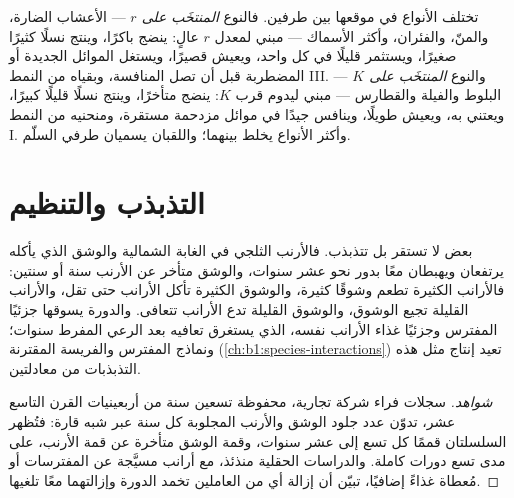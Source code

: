 \begin{definition}\label{def:b1:populations:rK}
تختلف الأنواع في موقعها بين طرفين. فالنوع \emph{المنتخَب على $r$}
--- الأعشاب الضارة، والمنّ، والفئران، وأكثر الأسماك --- مبني
لمعدل $r$ عالٍ: ينضج باكرًا، وينتج نسلًا كثيرًا صغيرًا، ويستثمر
قليلًا في كل واحد، ويعيش قصيرًا، ويستغل الموائل الجديدة أو المضطربة
قبل أن تصل المنافسة، وبقياه من النمط III. والنوع \emph{المنتخَب على
$K$} --- البلوط والفيلة والقطارس --- مبني ليدوم قرب $K$: ينضج
متأخرًا، وينتج نسلًا قليلًا كبيرًا، ويعتني به، ويعيش طويلًا،
وينافس جيدًا في موائل مزدحمة مستقرة، ومنحنيه من النمط I. وأكثر
الأنواع يخلط بينهما؛ واللقبان يسميان طرفي السلّم.
\end{definition}

\section{التذبذب والتنظيم}

\begin{proposition}\label{prop:b1:populations:cycles}
بعض  لا تستقر بل تتذبذب. فالأرنب الثلجي في الغابة الشمالية
والوشق الذي يأكله يرتفعان ويهبطان معًا بدور نحو عشر سنوات، والوشق
متأخر عن الأرنب سنة أو سنتين: فالأرانب الكثيرة تطعم وشوقًا كثيرة،
والوشوق الكثيرة تأكل الأرانب حتى تقل، والأرانب القليلة تجيع
الوشوق، والوشوق القليلة تدع الأرانب تتعافى. والدورة يسوقها جزئيًا
المفترس وجزئيًا غذاء الأرانب نفسه، الذي يستغرق تعافيه بعد الرعي
المفرط سنوات؛ ونماذج المفترس والفريسة المقترنة
(\cref{ch:b1:species-interactions}) تعيد إنتاج مثل هذه التذبذبات من
معادلتين.
\end{proposition}
\begin{proof}[شواهد]
سجلات فراء شركة تجارية، محفوظة تسعين سنة من أربعينيات القرن التاسع
عشر، تدوّن عدد جلود الوشق والأرنب المجلوبة كل سنة عبر شبه قارة:
فتُظهر السلسلتان قممًا كل تسع إلى عشر سنوات، وقمة الوشق متأخرة عن
قمة الأرنب، على مدى تسع دورات كاملة. والدراسات الحقلية منذئذ، مع
أرانب مسيَّجة عن المفترسات أو مُعطاة غذاءً إضافيًا، تبيّن أن إزالة
أي من العاملين تخمد الدورة وإزالتهما معًا تلغيها.
\end{proof}

